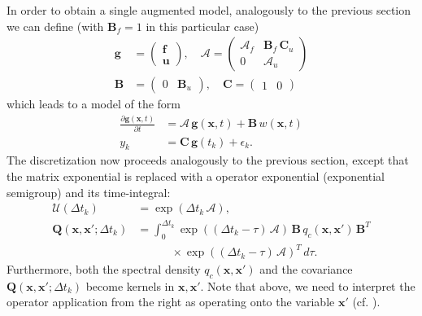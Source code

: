 \documentclass[journal]{IEEEtran}
\begin{document}
In order to obtain a single augmented model, analogously to the previous section we can define (with $\mathbf{B}_f = 1$ in this particular case)
%
\begin{equation}
\begin{split}
  \mathbf{g} &= \begin{pmatrix}
	\mathbf{f} \\ \mathbf{u}
  \end{pmatrix}, \quad
  \mathbf{\mathcal{A}}
  = \begin{pmatrix}
	\mathbf{\mathcal{A}}_f & \mathbf{B}_f \, \mathbf{C}_u \\
	0 & \mathbf{\mathcal{A}}_u
  \end{pmatrix} \\
  \mathbf{B}
  &= \begin{pmatrix}
	0 & \mathbf{B}_u
  \end{pmatrix}, \quad
  \mathbf{C}
  = \begin{pmatrix}
	1 & 0
  \end{pmatrix}
\end{split}
\end{equation}
%
which leads to a model of the form
%
\begin{equation}
\begin{split}
  \frac{\partial \mathbf{g}(\mathbf{x},t)}{\partial t}
  &= \mathbf{\mathcal{A}} \, \mathbf{g}(\mathbf{x},t)
  + \mathbf{B} \, w(\mathbf{x},t) \\
  y_k &= \mathbf{C} \, \mathbf{g}(t_k) + \epsilon_k.
\end{split}
\label{eq:ssaug2}
\end{equation}
%
The discretization now proceeds analogously to the previous section, except that the matrix exponential is replaced with a operator exponential (exponential semigroup) and its time-integral:
%
\begin{equation}
\begin{split}
  \mathbf{\mathcal{U}}(\Delta t_k)  &= \exp(\Delta t_k \, \mathbf{\mathcal{A}}), \\
  \mathbf{Q}(\mathbf{x},\mathbf{x}';\Delta t_k) &= \int_0^{\Delta t_k} \exp((\Delta t_k - \tau) \, 
  \mathbf{\mathcal{A}}) \,
  \mathbf{B} \, q_c(\mathbf{x},\mathbf{x}')  \, \mathbf{B}^T \\
  &\qquad \quad \times \exp((\Delta t_k - \tau) \, \mathbf{\mathcal{A}})^T \, d\tau.
\end{split}
\label{eq:dssaug}
\end{equation}
%
Furthermore, both the spectral density $q_c(\mathbf{x},\mathbf{x}')$ and the covariance $\mathbf{Q}(\mathbf{x},\mathbf{x}';\Delta t_k)$ become kernels in $\mathbf{x},\mathbf{x}'$. Note that above, we need to interpret the operator application from the right as operating onto the variable $\mathbf{x}'$ (cf. \cite{Sarkka+Hartikainen:2012}).
\end{document}
